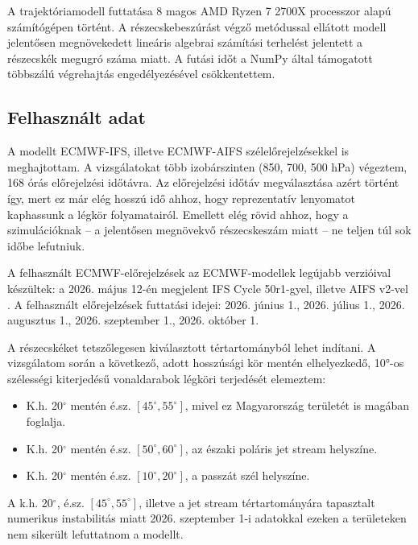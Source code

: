 \documentclass[12pt,a4paper]{article}
\begin{document}
A trajektóriamodell futtatása 8 magos AMD Ryzen 7 2700X processzor alapú számítógépen történt. A részecskebeszúrást végző metódussal ellátott modell jelentősen megnövekedett lineáris algebrai számítási terhelést jelentett a részecskék megugró száma miatt. A futási időt a NumPy által támogatott többszálú végrehajtás engedélyezésével csökkentettem.

\subsection{Felhasznált adat}

A modellt ECMWF-IFS, illetve ECMWF-AIFS szélelőrejelzésekkel is meghajtottam. A vizsgálatokat több izobárszinten (850, 700, 500 hPa) végeztem, 168 órás előrejelzési időtávra. Az előrejelzési időtáv megválasztása azért történt így, mert ez már elég hosszú idő ahhoz, hogy reprezentatív lenyomatot kaphassunk a légkör folyamatairól. Emellett elég rövid ahhoz, hogy a szimulációknak -- a jelentősen megnövekvő részecskeszám miatt -- ne teljen túl sok időbe lefutniuk. 

A felhasznált ECMWF-előrejelzések az ECMWF-modellek legújabb verzióival készültek: a 2026. május 12-én megjelent IFS Cycle 50r1-gyel, illetve AIFS v2-vel \cite{snell_significant_2026}. A felhasznált előrejelzések futtatási idejei: 2026. június 1., 2026. július 1., 2026. augusztus 1., 2026. szeptember 1., 2026. október 1.

A részecskéket tetszőlegesen kiválasztott tértartományból lehet indítani. A vizsgálatom során a következő, adott hosszúsági kör mentén elhelyezkedő, 10°-os szélességi kiterjedésű vonaldarabok légköri terjedését elemeztem:
\begin{itemize}
    \item K.h. 20$^\circ$ mentén é.sz. $[45^\circ, 55^\circ]$, mivel ez Magyarország területét is magában foglalja.
    \item K.h. 20$^\circ$ mentén é.sz. $[50^\circ, 60^\circ]$, az északi poláris jet stream helyszíne.
    \item K.h. 20$^\circ$ mentén é.sz. $[10^\circ, 20^\circ]$, a passzát szél helyszíne.
\end{itemize}


A k.h. 20$^\circ$, é.sz. $[45^\circ, 55^\circ]$, illetve a jet stream tértartományára tapasztalt numerikus instabilitás miatt 2026. szeptember 1-i adatokkal ezeken a területeken nem sikerült lefuttatnom a modellt.
\end{document}
